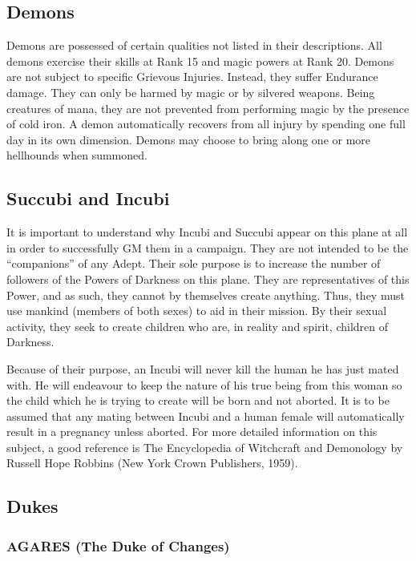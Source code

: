 \begin{multicols*}{2}

\setlength\columnseprule{0.2mm}

\section{Demons}
Demons are possessed of certain qualities not listed in their
descriptions.  All demons exercise their skills at Rank 15 and magic
powers at Rank 20.  Demons are not subject to specific Grievous
Injuries.  Instead, they suffer Endurance damage.  They can only be
harmed by magic or by silvered weapons.  Being creatures of mana, they
are not prevented from performing magic by the presence of cold iron.
A demon automatically recovers from all injury by spending one full
day in its own dimension.  Demons may choose to bring along one or
more hellhounds when summoned.

\subsection{Succubi and Incubi}
It is important to understand why Incubi and Succubi appear on this
plane at all in order to successfully GM them in a campaign.  They are
not intended to be the ``companions'' of any Adept.  Their sole
purpose is to increase the number of followers of the Powers of
Darkness on this plane.  They are representatives of this Power, and
as such, they cannot by themselves create anything.  Thus, they must
use mankind (members of both sexes) to aid in their mission.  By their
sexual activity, they seek to create children who are, in reality and
spirit, children of Darkness.

Because of their purpose, an Incubi will never kill the human he has
just mated with.  He will endeavour to keep the nature of his true
being from this woman so the child which he is trying to create will
be born and not aborted.  It is to be assumed that any mating between
Incubi and a human female will automatically result in a pregnancy
unless aborted.  For more detailed information on this subject, a good
reference is The Encyclopedia of Witchcraft and Demonology by Russell
Hope Robbins (New York Crown Publishers, 1959).

\subsection{Dukes}

\subsubsection{AGARES (The Duke of Changes)}


\end{multicols*}
